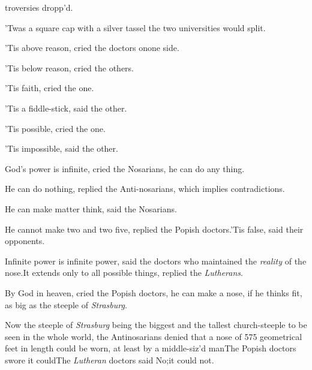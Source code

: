 \documentclass[twoside]{article}
\begin{document}
\vskip -2pt

troversies dropp’d.

\vskip -2pt

’Twas a square cap with a silver tassel\break
{}
the two universities would split.

\vskip -2pt

’Tis above reason, cried the doctors on\break one side.

\vskip -2pt

’Tis below reason, cried the others.

\vskip -2pt

’Tis faith, cried the one.

’Tis a fiddle-stick, said the other.

’Tis possible, cried the one.

’Tis impossible, said the other.

God’s power is infinite, cried the No\-sarians, he can do
any thing.

He can do nothing, replied the Anti-nosarians, which implies
contradictions.

He can make matter think, said the Nosarians.


\break
{}

He cannot make two and two five, replied the Popish
doctors.\tsh ’Tis false, said their opponents.\tsk

Infinite power is infinite power, said the doctors who
maintained the \textit{reality}
of the nose.\tsh It extends only to
all possible things, replied the \textit{Lutherans}.

By God in heaven, cried the Popish doctors, he can make a nose,
if he thinks fit, as big as the steeple of \textit{Strasburg}.

Now the steeple of \textit{Strasburg} being the biggest and the
tallest church-steeple to be seen in the whole world, the
Antino\-sarians denied that a nose of 575 geome\-trical feet in length
could be worn, at least by a middle-siz’d
man\tsk The Popish doctors swore it could\tsk The
\textit{Lutheran} doctors said No;\tsk it could not.
\end{document}
